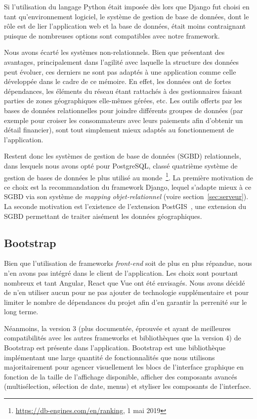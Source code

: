 \documentclass{EPL-master-thesis-covers-FR}
\begin{document}
				Si l'utilisation du langage Python était imposée dès lors que Django fut choisi en tant qu'environnement logiciel, le système de gestion de base de données, dont le rôle est de lier l'application web et la base de données, était moins contraignant puisque de nombreuses options sont compatibles avec notre framework.

				Nous avons écarté les systèmes non-relationnels. Bien que présentant des avantages, principalement dans l'agilité avec laquelle la structure des données peut évoluer, ces derniers ne sont pas adaptés à une application comme celle développée dans le cadre de ce mémoire. En effet, les données ont de fortes dépendances, les éléments du réseau étant rattachés à des gestionnaires faisant parties de zones géographiques elle-mêmes gérées, etc. Les outils offerts par les bases de données relationnelles pour joindre différents groupes de données (par exemple pour croiser les consommateurs avec leurs paiements afin d'obtenir un détail financier), sont tout simplement mieux adaptés au fonctionnement de l'application.

				Restent donc les systèmes de gestion de base de données (SGBD) relationnels, dans lesquels nous avons opté pour PostgreSQL, classé quatrième système de gestion de bases de données le plus utilisé au monde~\footnote{\url{https://db-engines.com/en/ranking}, 1 mai 2019}. La première motivation de ce choix est la recommandation du framework Django, lequel s'adapte mieux à ce SGBD via son système de \emph{mapping objet-relationnel} (voire section~\ref{sec:serveur}). La seconde motivation est l'existence de l'extension PostGIS~\cite{ref:postgis}, une extension du SGBD permettant de traiter aisément les données géographiques.

			\subsection*{Bootstrap}

				Bien que l'utilisation de frameworks \emph{front-end} soit de plus en plus répandue, nous n'en avons pas intégré dans le client de l'application. Les choix sont pourtant nombreux et tant Angular, React que Vue ont été envisagés. Nous avons décidé de n'en utiliser aucun pour ne pas ajouter de technologie supplémentaire et pour limiter le nombre de dépendances du projet afin d'en garantir la perrenité sur le long terme.

				Néanmoins, la version 3 (plus documentée, éprouvée et ayant de meilleures compatibilités avec les autres frameworks et bibliothèques que la version 4) de Bootstrap est présente dans l'application. Bootstrap est une bibliothèque implémentant une large quantité de fonctionnalités que nous utilisons majoritairement pour agencer visuellement les blocs de l'interface graphique en fonction de la taille de l'affichage disponible, afficher des composants avancés (multisélection, sélection de date, menus) et styliser les composants de l'interface.
\end{document}
